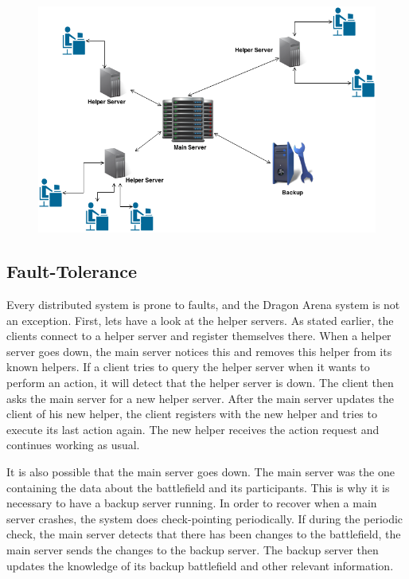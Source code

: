 \begin{figure}[ht]
\includegraphics[scale=0.5]{DCS.png}
\end{figure}

\subsection{Fault-Tolerance}
Every distributed system is prone to faults, and the Dragon Arena system is not an exception. 
First, lets have a look at the helper servers. As stated earlier, the clients connect to a helper server and register themselves there.
When a helper server goes down, the main server notices this and removes this helper from its known helpers.
If a client tries to query the helper server when it wants to perform an action, it will detect that the helper server is down.
The client then asks the main server for a new helper server.
After the main server updates the client of his new helper, the client registers with the new helper and tries to execute its last action again.
The new helper receives the action request and continues working as usual.

It is also possible that the main server goes down. 
The main server was the one containing the data about the battlefield and its participants.
This is why it is necessary to have a backup server running.  
In order to recover when a main server crashes, the system does check-pointing periodically.
If during the periodic check, the main server detects that there has been changes to the battlefield, the main server sends the changes to the backup server.
The backup server then updates the knowledge of its backup battlefield and other relevant information.

